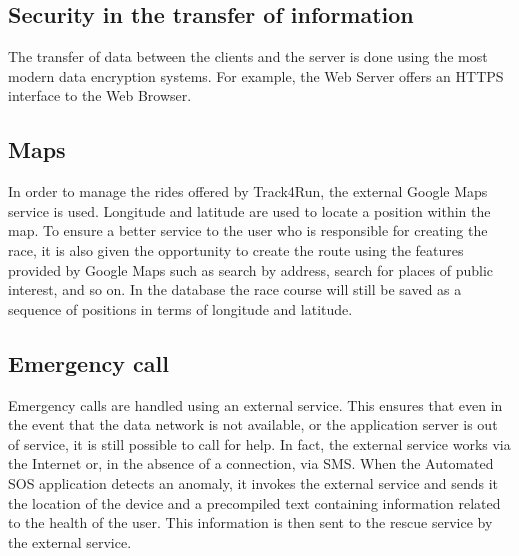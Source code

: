 \subsection{Security in the transfer of information}
The transfer of data between the clients and the server is done using the most modern data encryption systems.
For example, the Web Server offers an HTTPS interface to the Web Browser.

\subsection{Maps}
In order to manage the rides offered by Track4Run, the external Google Maps service is used.
Longitude and latitude are used to locate a position within the map.
To ensure a better service to the user who is responsible for creating the race, it is also given the opportunity to create the route using the features provided by Google Maps such as search by address, search for places of public interest, and so on. In the database the race course will still be saved as a sequence of positions in terms of longitude and latitude.

\subsection{Emergency call}
Emergency calls are handled using an external service.
This ensures that even in the event that the data network is not available, or the application server is out of service, it is still possible to call for help.
In fact, the external service works via the Internet or, in the absence of a connection, via SMS.
When the Automated SOS application detects an anomaly, it invokes the external service and sends it the location of the device and a precompiled text containing information related to the health of the user.
This information is then sent to the rescue service by the external service.
